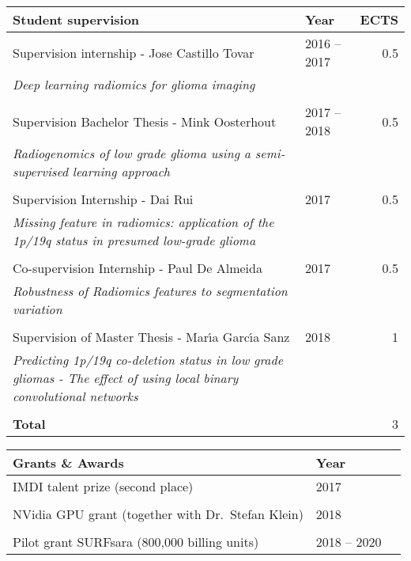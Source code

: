 \vspace*{0.5cm}
\begin{tabular}{L{8cm}lr}
    \textbf{Student supervision}&\textbf{Year}&\textbf{ECTS}\\
    \toprule
    Supervision internship - Jose Castillo Tovar & 2016 -- 2017 & 0.5 \\
    \textit{Deep learning radiomics for glioma imaging}\\
    \\
    Supervision Bachelor Thesis - Mink Oosterhout & 2017 -- 2018 & 0.5 \\
    \textit{Radiogenomics of low grade glioma using a semi-supervised learning approach}\\
    \\
    Supervision Internship - Dai Rui & 2017 & 0.5 \\
    \textit{Missing feature in radiomics: application of the 1p/19q status in presumed low-grade glioma}\\
    \\
    Co-supervision Internship - Paul De Almeida & 2017 & 0.5\\
    \textit{Robustness of Radiomics features to segmentation variation}\\
    \\
    Supervision of Master Thesis - Mar{\'\i}a Garc{\'\i}a Sanz & 2018 & 1\\
    \textit{Predicting 1p/19q co-deletion status in low grade gliomas - The effect of using local binary convolutional networks}\\
    \\
    \textbf{Total} & & 3\\
\end{tabular}


\newpage
\begin{tabular}{L{8cm}lr}
    \textbf{Grants \& Awards}&\textbf{Year}\\
    \toprule
    IMDI talent prize (second place) & 2017\\
    \\
    NVidia GPU grant (together with Dr.~Stefan Klein) & 2018\\
    \\
    Pilot grant SURFsara (800,000 billing units) & 2018 -- 2020\\
\end{tabular}

